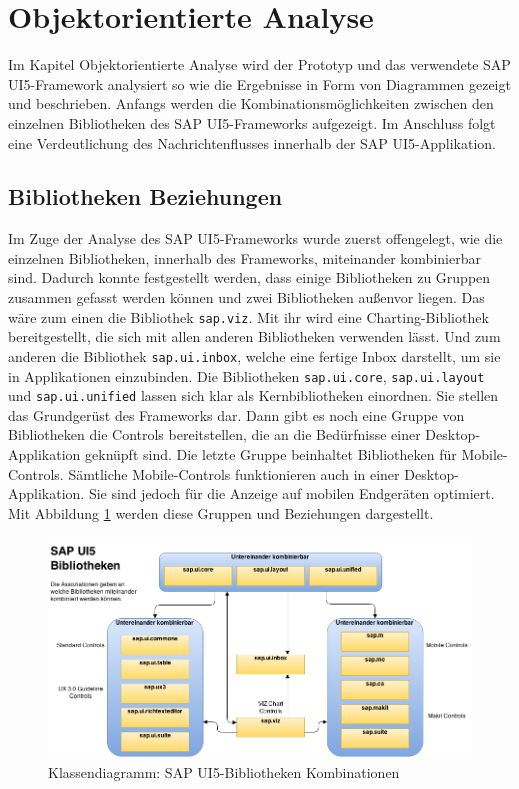 \section{Objektorientierte Analyse}\label{analyse}
Im Kapitel Objektorientierte Analyse wird der Prototyp und das verwendete SAP UI5-Framework analysiert so wie die Ergebnisse in Form von Diagrammen gezeigt und beschrieben. Anfangs werden die Kombinationsmöglichkeiten zwischen den einzelnen Bibliotheken des SAP UI5-Frameworks aufgezeigt. Im Anschluss folgt eine Verdeutlichung des Nachrichtenflusses innerhalb der SAP UI5-Applikation.

\subsection{Bibliotheken Beziehungen}
Im Zuge der Analyse des SAP UI5-Frameworks wurde zuerst offengelegt, wie die einzelnen Bibliotheken, innerhalb des Frameworks, miteinander kombinierbar sind. Dadurch konnte festgestellt werden, dass einige Bibliotheken zu Gruppen zusammen gefasst werden können und zwei Bibliotheken außenvor liegen. Das wäre zum einen die Bibliothek \texttt{sap.viz}. Mit ihr wird eine Charting-Bibliothek bereitgestellt, die sich mit allen anderen Bibliotheken verwenden lässt. Und zum anderen die Bibliothek \texttt{sap.ui.inbox}, welche eine fertige Inbox darstellt, um sie in Applikationen einzubinden. Die Bibliotheken \texttt{sap.ui.core}, \texttt{sap.ui.layout} und \texttt{sap.ui.unified} lassen sich klar als Kernbibliotheken einordnen. Sie stellen das Grundgerüst des Frameworks dar. Dann gibt es noch eine Gruppe von Bibliotheken die Controls bereitstellen, die an die Bedürfnisse einer Desktop-Applikation geknüpft sind. Die letzte Gruppe beinhaltet Bibliotheken für Mobile-Controls. Sämtliche Mobile-Controls funktionieren auch in einer Desktop-Applikation. Sie sind jedoch für die Anzeige auf mobilen Endgeräten optimiert. Mit Abbildung \ref{fig:sapui5libconnections} werden diese Gruppen und Beziehungen dargestellt.

\vspace{1em}
\begin{figure}[htb]
  \centering
  \includegraphics[width=0.95\linewidth]{abb/sapui5_lib_connections}
  \caption[Klassendiagramm: SAP UI5-Bibliotheken Kombinationen]{Klassendiagramm: SAP UI5-Bibliotheken Kombinationen}
  \label{fig:sapui5libconnections}
\end{figure}

